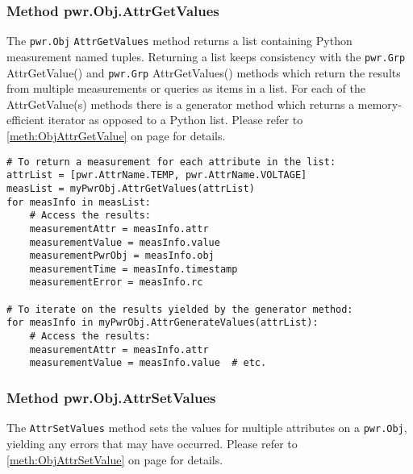 \documentclass[12pt]{report} %
\begin{document}
\begin{appendices}
\subsubsection{Method pwr.Obj.AttrGetValues}
\label{meth:ObjAttrGetValues}

The \texttt{pwr.Obj} \texttt{AttrGetValues} method returns a list containing Python
measurement named tuples. Returning a list keeps consistency with the
\texttt{pwr.Grp} AttrGetValue() and \texttt{pwr.Grp} AttrGetValues()
methods which return the results from multiple measurements or queries as items
in a list. For each of the AttrGetValue(s) methods there is a generator
method which returns a memory-efficient iterator as opposed to a Python list.
Please refer to \ref{meth:ObjAttrGetValue} on page
\pageref{meth:ObjAttrGetValue} for details.

\begin{center}\begin{minipage}{.95\linewidth}\begin{lstlisting}
# To return a measurement for each attribute in the list:
attrList = [pwr.AttrName.TEMP, pwr.AttrName.VOLTAGE]
measList = myPwrObj.AttrGetValues(attrList)
for measInfo in measList:
    # Access the results:
    measurementAttr = measInfo.attr
    measurementValue = measInfo.value
    measurementPwrObj = measInfo.obj
    measurementTime = measInfo.timestamp
    measurementError = measInfo.rc

# To iterate on the results yielded by the generator method:
for measInfo in myPwrObj.AttrGenerateValues(attrList):
    # Access the results:
    measurementAttr = measInfo.attr
    measurementValue = measInfo.value  # etc.
\end{lstlisting}\end{minipage}\end{center}

\subsubsection{Method pwr.Obj.AttrSetValues}
\label{meth:ObjAttrSetValues}

The \texttt{AttrSetValues} method sets the values for multiple attributes on a
\texttt{pwr.Obj}, yielding any errors that may have occurred.
Please refer to
\ref{meth:ObjAttrSetValue} on page \pageref{meth:ObjAttrSetValue} for details.


\end{appendices}
\end{document}
